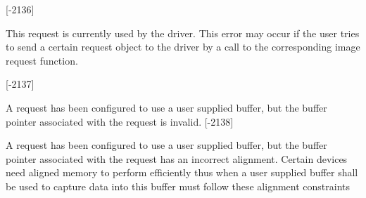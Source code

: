\begin{Desc}
\begin{description}
{\bfseries }\mbox{[}-\/2136\mbox{]} \item[{\em 
\hypertarget{group___common_interface_gga112225e5fbaaaef6445ff4ebf98f8e03a7b4452823a215edaee172876094483e4}{D\+E\+V\+\_\+\+R\+E\+Q\+U\+E\+S\+T\+\_\+\+A\+L\+R\+E\+A\+D\+Y\+\_\+\+I\+N\+\_\+\+U\+S\+E}\label{group___common_interface_gga112225e5fbaaaef6445ff4ebf98f8e03a7b4452823a215edaee172876094483e4}
}]This request is currently used by the driver. This error may occur if the user tries to send a certain request object to the driver by a call to the corresponding image request function.

{\bfseries }\mbox{[}-\/2137\mbox{]} \item[{\em 
\hypertarget{group___common_interface_gga112225e5fbaaaef6445ff4ebf98f8e03a471a91cf378a66e3c8fb2b398250fffc}{D\+E\+V\+\_\+\+R\+E\+Q\+U\+E\+S\+T\+\_\+\+B\+U\+F\+F\+E\+R\+\_\+\+I\+N\+V\+A\+L\+I\+D}\label{group___common_interface_gga112225e5fbaaaef6445ff4ebf98f8e03a471a91cf378a66e3c8fb2b398250fffc}
}]A request has been configured to use a user supplied buffer, but the buffer pointer associated with the request is invalid. {\bfseries }\mbox{[}-\/2138\mbox{]} \item[{\em 
\hypertarget{group___common_interface_gga112225e5fbaaaef6445ff4ebf98f8e03afa11e7ddf98c8b92e3ed4a0325d322c5}{D\+E\+V\+\_\+\+R\+E\+Q\+U\+E\+S\+T\+\_\+\+B\+U\+F\+F\+E\+R\+\_\+\+M\+I\+S\+A\+L\+I\+G\+N\+E\+D}\label{group___common_interface_gga112225e5fbaaaef6445ff4ebf98f8e03afa11e7ddf98c8b92e3ed4a0325d322c5}
}]A request has been configured to use a user supplied buffer, but the buffer pointer associated with the request has an incorrect alignment. Certain devices need aligned memory to perform efficiently thus when a user supplied buffer shall be used to capture data into this buffer must follow these alignment constraints


\end{description}
\end{Desc}
